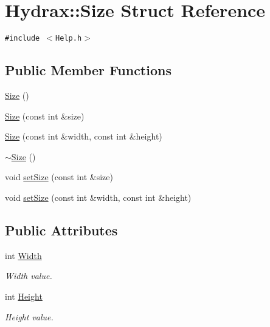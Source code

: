\hypertarget{struct_hydrax_1_1_size}{
\section{Hydrax::Size Struct Reference}
\label{struct_hydrax_1_1_size}
}
{\tt \#include $<$Help.h$>$}

\subsection*{Public Member Functions}
\begin{CompactItemize}
\item 
\hyperlink{struct_hydrax_1_1_size_39cf079297d9a43d89c71e6fbd5ade83}{Size} ()
\item 
\hyperlink{struct_hydrax_1_1_size_551027687e3c4646e6887df821ff9e1b}{Size} (const int \&size)
\item 
\hyperlink{struct_hydrax_1_1_size_a4a9f0e492ed8f602f6f5e5955042464}{Size} (const int \&width, const int \&height)
\item 
\hyperlink{struct_hydrax_1_1_size_ace8e593f9b2c5f6672f401ba86a2df9}{$\sim$Size} ()
\item 
void \hyperlink{struct_hydrax_1_1_size_ed24a854ee32305fda00bd0c41fa2d0a}{setSize} (const int \&size)
\item 
void \hyperlink{struct_hydrax_1_1_size_a8ab07e13e4931f071f6af2161728168}{setSize} (const int \&width, const int \&height)
\end{CompactItemize}
\subsection*{Public Attributes}
\begin{CompactItemize}
\item 
int \hyperlink{struct_hydrax_1_1_size_5dfca2c4f9a35424d03dfbbe34da0b84}{Width}
\begin{CompactList}\small\item\em Width value. \item\end{CompactList}\item 
int \hyperlink{struct_hydrax_1_1_size_24e29f4f28eb941f06d9f424807691e6}{Height}
\begin{CompactList}\small\item\em Height value. \item\end{CompactList}\end{CompactItemize}


